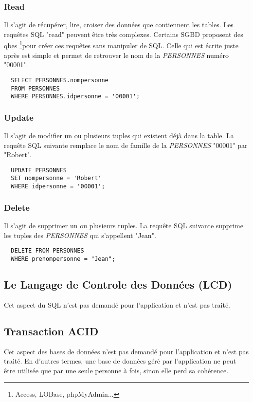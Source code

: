 \subsubsection{Read}
Il s'agit de récupérer, lire, croiser des données que contiennent les tables.
Les requêtes SQL  "read" peuvent être très complexes.
Certains SGBD proposent des \glspl{qbe}
\footnote{Access, LOBase, phpMyAdmin...}pour créer ces requêtes sans manipuler de SQL.
Celle qui est écrite juste après est simple et permet de retrouver le nom de la \textit{PERSONNES} numéro "00001".
\begin{lstlisting}
  SELECT PERSONNES.nompersonne
  FROM PERSONNES
  WHERE PERSONNES.idpersonne = '00001';
\end{lstlisting}

\subsubsection{Update}
Il s'agit de modifier un ou plusieurs tuples qui existent déjà dans la table.
La requête SQL suivante remplace le nom de famille de la \textit{PERSONNES} "00001" par "Robert".
\begin{lstlisting}
  UPDATE PERSONNES
  SET nompersonne = 'Robert'
  WHERE idpersonne = '00001';
\end{lstlisting}

\subsubsection{Delete}
Il s'agit de supprimer un ou plusieurs tuples.
La requête SQL suivante supprime les tuples des \textit{PERSONNES} qui s'appellent "Jean".
\begin{lstlisting}
  DELETE FROM PERSONNES
  WHERE prenompersonne = "Jean";
\end{lstlisting}

\subsection{Le Langage de Controle des Données (LCD)}
Cet aspect du SQL n'est pas demandé pour l'application et n'est pas traité.

\subsection{Transaction ACID}
Cet aspect des bases de données n'est pas demandé pour l'application et n'est pas traité.
En d'autres termes, une base de données géré par l'application ne peut être utilisée que par une seule personne à fois, sinon elle perd sa cohérence.

